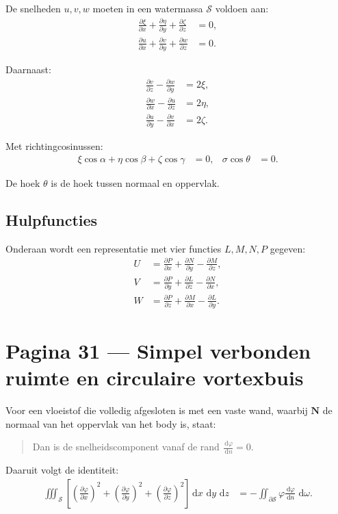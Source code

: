 \documentclass[11pt]{article}
\newcommand{\dd}{\,\mathrm{d}}
\newcommand{\pd}[2]{\frac{\partial #1}{\partial #2}}
\newcommand{\td}[2]{\frac{\dd #1}{\dd #2}}
\newcommand{\vect}[1]{\mathbf{#1}}
\begin{document}
De snelheden $u,v,w$ moeten in een watermassa $\mathcal{S}$ voldoen aan:
\begin{align*}
\pd{\xi}{x}
+\pd{\eta}{y}
+\pd{\zeta}{z}
&=
0,
\\
\pd{u}{x}
+\pd{v}{y}
+\pd{w}{z}
&=
0.
\end{align*}

Daarnaast:
\begin{align*}
\pd{v}{z}
-\pd{w}{y}
&=
2\xi,
\\
\pd{w}{x}
-\pd{u}{z}
&=
2\eta,
\\
\pd{u}{y}
-\pd{v}{x}
&=
2\zeta.
\end{align*}

Met richtingcosinussen:
\begin{align*}
\xi\cos\alpha+\eta\cos\beta+\zeta\cos\gamma&=0,
&
\sigma\cos\theta&=0.
\end{align*}

De hoek $\theta$ is de hoek tussen normaal en oppervlak.

\subsection*{Hulpfuncties}

Onderaan wordt een representatie met vier functies $L,M,N,P$ gegeven:
\begin{align*}
U
&=
\pd{P}{x}
+\pd{N}{y}
-\pd{M}{z},
\\
V
&=
\pd{P}{y}
+\pd{L}{z}
-\pd{N}{x},
\\
W
&=
\pd{P}{z}
+\pd{M}{x}
-\pd{L}{y}.
\end{align*}

\newpage

\section*{Pagina 31 --- Simpel verbonden ruimte en circulaire vortexbuis}

Voor een vloeistof die volledig afgesloten is met een vaste wand, waarbij $\vect{N}$ de normaal van het oppervlak van het body is, staat:
\begin{quote}
Dan is de snelheidscomponent vanaf de rand $\td{\varphi}{n}=0$.
\end{quote}

Daaruit volgt de identiteit:
\begin{align*}
\iiint_{\mathcal{S}}
\left[
\left(\pd{\varphi}{x}\right)^2
+
\left(\pd{\varphi}{y}\right)^2
+
\left(\pd{\varphi}{z}\right)^2
\right]
\dd x\,\dd y\,\dd z
&=
-
\iint_{\partial\mathcal{S}}
\varphi\td{\varphi}{n}\,\dd\omega .
\end{align*}
\end{document}
